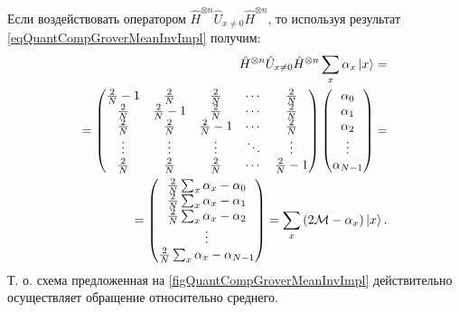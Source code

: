 Если воздействовать оператором $\hat{H}^{\otimes n}\hat{U}_{x \ne
  0}\hat{H}^{\otimes n}$, то используя результат
\eqref{eqQuantCompGroverMeanInvImpl} получим:
\begin{eqnarray}
\hat{H}^{\otimes n}\hat{U}_{x \ne
  0}\hat{H}^{\otimes n} \sum_x \alpha_x \ket{ x } = 
\nonumber \\
=
\begin{pmatrix}
\frac{2}{N} - 1  & \frac{2}{N} & \frac{2}{N} & \cdots & \frac{2}{N} \\
\frac{2}{N} & \frac{2}{N} - 1 & \frac{2}{N} & \cdots & \frac{2}{N} \\
\frac{2}{N} & \frac{2}{N} & \frac{2}{N} - 1 & \cdots & \frac{2}{N} \\
\vdots & \vdots & \vdots & \ddots & \vdots \\
\frac{2}{N} & \frac{2}{N} & \frac{2}{N} & \cdots & \frac{2}{N} - 1\\
\end{pmatrix}
\begin{pmatrix}
\alpha_0 \\
\alpha_1 \\
\alpha_2 \\
\vdots \\
\alpha_{N - 1} \\
\end{pmatrix}
=
\nonumber \\
=
\begin{pmatrix}
\frac{2}{N}\sum_x\alpha_x - \alpha_0\\
\frac{2}{N}\sum_x\alpha_x - \alpha_1\\
\frac{2}{N}\sum_x\alpha_x - \alpha_2\\
\vdots \\
\frac{2}{N}\sum_x\alpha_x - \alpha_{N-1}\\
\end{pmatrix} = 
\sum_x \left(2 \mathcal{M} - \alpha_x \right)\ket{ x }.
\nonumber
\end{eqnarray}
Т. о. схема предложенная на \autoref{figQuantCompGroverMeanInvImpl}
действительно осуществляет обращение относительно среднего.
